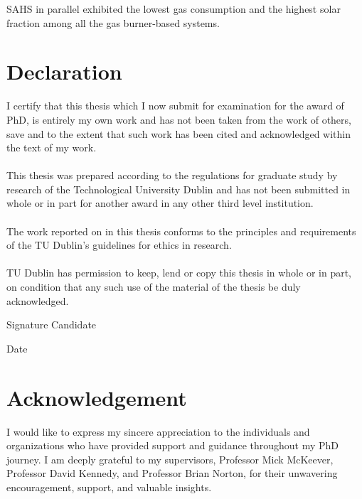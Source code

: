 SAHS in parallel exhibited the lowest gas consumption and the highest solar fraction among all the gas burner-based systems.

\chapter*{Declaration}
\vspace*{1cm}

\noindent I certify that this thesis which I now submit for examination for the award of PhD, is entirely my own work and has not been taken from the work of others, save and to the extent that such work has been cited and acknowledged within the text of my work.
\\ \\
\noindent This thesis was prepared according to the regulations for graduate study by research of the Technological University Dublin and has not been submitted in whole or in part for another award in any other third level institution.
\\ \\
\noindent The work reported on in this thesis conforms to the principles and requirements of the TU Dublin's guidelines for ethics in research.
\\ \\
\noindent TU Dublin has permission to keep, lend or copy this thesis in whole or in part, on condition that any such use of the material of the thesis be duly acknowledged. 

\vspace*{3cm}

\noindent \parbox[t]{2cm}{Signature Candidate} \makebox[6cm]{\hrulefill} \hfill Date \makebox[3cm]{\hrulefill} \\

\chapter*{Acknowledgement}
\vspace*{1cm}

I would like to express my sincere appreciation to the individuals and organizations who have provided support and guidance throughout my PhD journey. I am deeply grateful to my supervisors, Professor Mick McKeever, Professor David Kennedy, and Professor Brian Norton, for their unwavering encouragement, support, and valuable insights.

